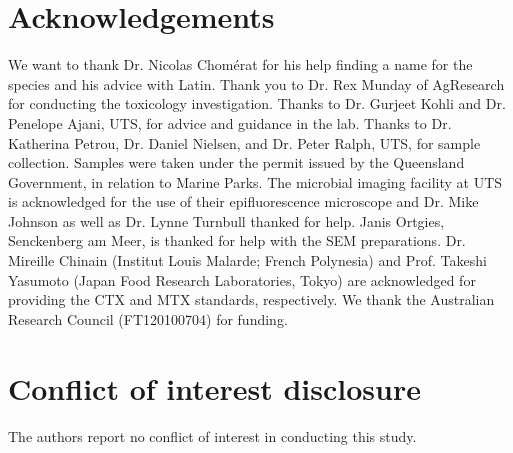 \documentclass[12pt]{article}
\begin{document}
\newpage
\section{Acknowledgements}
We want to thank Dr. Nicolas Chom\'erat for his help finding a name for the species and his advice with Latin. 
Thank you to Dr. Rex Munday of AgResearch for conducting the toxicology investigation. 
Thanks to Dr. Gurjeet Kohli and Dr. Penelope Ajani, UTS, for advice and guidance in the lab. 
Thanks to Dr. Katherina Petrou, Dr. Daniel Nielsen, and Dr. Peter Ralph, UTS, for sample collection. 
Samples were taken under the permit issued by the Queensland Government, in relation to Marine Parks. 
The microbial imaging facility at UTS is acknowledged for the use of their epifluorescence microscope and Dr. Mike Johnson as well as Dr. Lynne Turnbull thanked for help. 
Janis Ortgies, Senckenberg am Meer, is thanked for help with the SEM preparations. 
Dr. Mireille Chinain (Institut Louis Malarde; French Polynesia) and Prof. Takeshi Yasumoto (Japan Food Research Laboratories, Tokyo) are acknowledged for providing the CTX and MTX standards, respectively. 
We thank the Australian Research Council (FT120100704) for funding.

\section{Conflict of interest disclosure}
The authors report no conflict of interest in conducting this study.
\newpage
\end{document}

